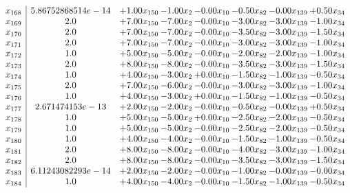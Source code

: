 \documentclass[8pt]{article}
\begin{document}
\[\begin{array}{c| c c@{\hskip 2pt} c@{\hskip 2pt} c@{\hskip 2pt} c@{\hskip 2pt} c@{\hskip 2pt} c@{\hskip 2pt} }
 x_{168}   &  5.86752868514e-14 & +  1.00 x_{150} & -1.00 x_{2} & -0.00 x_{10} & -0.50 x_{82} & -0.00 x_{139} & +  0.50 x_{34}\\
 x_{169}   &  2.0 & +  7.00 x_{150} & -7.00 x_{2} & -0.00 x_{10} & -3.00 x_{82} & -3.00 x_{139} & -1.00 x_{34}\\
 x_{170}   &  2.0 & +  7.00 x_{150} & -7.00 x_{2} & -0.00 x_{10} & -3.50 x_{82} & -3.00 x_{139} & -1.50 x_{34}\\
 x_{171}   &  2.0 & +  7.00 x_{150} & -7.00 x_{2} & -0.00 x_{10} & -3.00 x_{82} & -3.00 x_{139} & -1.00 x_{34}\\
 x_{172}   &  1.0 & +  5.00 x_{150} & -5.00 x_{2} & -0.00 x_{10} & -2.00 x_{82} & -2.00 x_{139} & -1.00 x_{34}\\
 x_{173}   &  2.0 & +  8.00 x_{150} & -8.00 x_{2} & -0.00 x_{10} & -3.50 x_{82} & -3.00 x_{139} & -1.50 x_{34}\\
 x_{174}   &  1.0 & +  4.00 x_{150} & -3.00 x_{2} & +  0.00 x_{10} & -1.50 x_{82} & -1.00 x_{139} & -0.50 x_{34}\\
 x_{175}   &  2.0 & +  7.00 x_{150} & -6.00 x_{2} & -0.00 x_{10} & -3.00 x_{82} & -3.00 x_{139} & -1.00 x_{34}\\
 x_{176}   &  1.0 & +  4.00 x_{150} & -3.00 x_{2} & +  0.00 x_{10} & -1.50 x_{82} & -1.00 x_{139} & -0.50 x_{34}\\
 x_{177}   &  2.671474153e-13 & +  2.00 x_{150} & -2.00 x_{2} & -0.00 x_{10} & -0.50 x_{82} & -0.00 x_{139} & +  0.50 x_{34}\\
 x_{178}   &  1.0 & +  5.00 x_{150} & -5.00 x_{2} & +  0.00 x_{10} & -2.50 x_{82} & -2.00 x_{139} & -0.50 x_{34}\\
 x_{179}   &  1.0 & +  5.00 x_{150} & -5.00 x_{2} & -0.00 x_{10} & -2.50 x_{82} & -2.00 x_{139} & -0.50 x_{34}\\
 x_{180}   &  1.0 & +  4.00 x_{150} & -4.00 x_{2} & -0.00 x_{10} & -1.50 x_{82} & -1.00 x_{139} & -0.50 x_{34}\\
 x_{181}   &  2.0 & +  8.00 x_{150} & -8.00 x_{2} & -0.00 x_{10} & -4.00 x_{82} & -3.00 x_{139} & -1.00 x_{34}\\
 x_{182}   &  2.0 & +  8.00 x_{150} & -8.00 x_{2} & -0.00 x_{10} & -3.50 x_{82} & -3.00 x_{139} & -1.50 x_{34}\\
 x_{183}   &  6.11243082293e-14 & +  2.00 x_{150} & -2.00 x_{2} & -0.00 x_{10} & -1.00 x_{82} & -0.00 x_{139} & -0.00 x_{34}\\
 x_{184}   &  1.0 & +  4.00 x_{150} & -4.00 x_{2} & -0.00 x_{10} & -1.50 x_{82} & -1.00 x_{139} & -0.50 x_{34}\\

\end{array}\]
\end{document}
